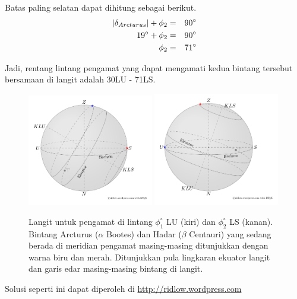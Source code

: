 \documentclass[11pt,fleqn]{exam}
\begin{document}
\begin{questions}
\begin{enumerate}[(a)]
Batas paling selatan dapat dihitung sebagai berikut.
\begin{eqnarray*}
|\delta_{Arcturus}|+\phi_{2}&=&90\textbf{\degree}\\
19\text{\degree}+\phi_{2}&=&90\text{\degree}\\
\phi_{2}&=&71\text{\degree}
\end{eqnarray*}

Jadi, rentang lintang pengamat yang dapat mengamati kedua bintang tersebut bersamaan di langit adalah 30\degree LU - 71\degree LS.

\begin{figure}[H]
\centering
\includegraphics[width=0.49\textwidth]{nomor20_30LU.pdf}
\includegraphics[width=0.49\textwidth]{nomor20_71LS.pdf}
\caption{Langit untuk pengamat di lintang $\phi_1^{\circ}$ LU (kiri) dan $\phi_2^{\circ}$ LS (kanan). Bintang Arcturus ($\alpha$ Bootes) dan Hadar ($\beta$ Centauri) yang sedang berada di meridian pengamat masing-masing ditunjukkan dengan warna biru dan merah. Ditunjukkan pula lingkaran ekuator langit dan garis edar masing-masing bintang di langit.}
\label{posisibintang}
\end{figure}

\end{enumerate}

\end{questions}


\vspace{3cm}
\begin{flushright}
Solusi seperti ini dapat diperoleh di \url{http://ridlow.wordpress.com}
\end{flushright}
\end{document}
